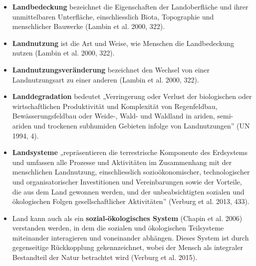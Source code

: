 \documentclass[
  nswissgerman,
  a4paper,
  DIV=11,
  numbers=noendperiod,
  oneside,
  openany]{scrreprt}
\begin{document}
\begin{itemize}
\item
  \textbf{Landbedeckung} bezeichnet die Eigenschaften der Landoberfläche
  und ihrer unmittelbaren Unterfläche, einschliesslich Biota,
  Topographie und menschlicher Bauwerke (Lambin et al. 2000, 322).
\item
  \textbf{Landnutzung} ist die Art und Weise, wie Menschen die
  Landbedeckung nutzen (Lambin et al. 2000, 322).
\item
  \textbf{Landnutzungsveränderung} bezeichnet den Wechsel von einer
  Landnutzungsart zu einer anderen (Lambin et al. 2000, 322).
\item
  \textbf{Landdegradation} bedeutet „Verringerung oder Verlust der
  biologischen oder wirtschaftlichen Produktivität und Komplexität von
  Regenfeldbau, Bewässerungsfeldbau oder Weide-, Wald- und Waldland in
  ariden, semi-ariden und trockenen subhumiden Gebieten infolge von
  Landnutzungen'' (UN 1994, 4).
\item
  \textbf{Landsysteme} „repräsentieren die terrestrische Komponente des
  Erdsystems und umfassen alle Prozesse und Aktivitäten im Zusammenhang
  mit der menschlichen Landnutzung, einschliesslich sozioökonomischer,
  technologischer und organisatorischer Investitionen und Vereinbarungen
  sowie der Vorteile, die aus dem Land gewonnen werden, und der
  unbeabsichtigten sozialen und ökologischen Folgen gesellschaftlicher
  Aktivitäten'' (Verburg et al. 2013, 433).
\item
  Land kann auch als ein \textbf{sozial-ökologisches System} (Chapin et
  al. 2006) verstanden werden, in dem die sozialen und ökologischen
  Teilsysteme miteinander interagieren und voneinander abhängen. Dieses
  System ist durch gegenseitige Rückkopplung gekennzeichnet, wobei der
  Mensch als integraler Bestandteil der Natur betrachtet wird (Verburg
  et al. 2015).
\end{itemize}
\end{document}

